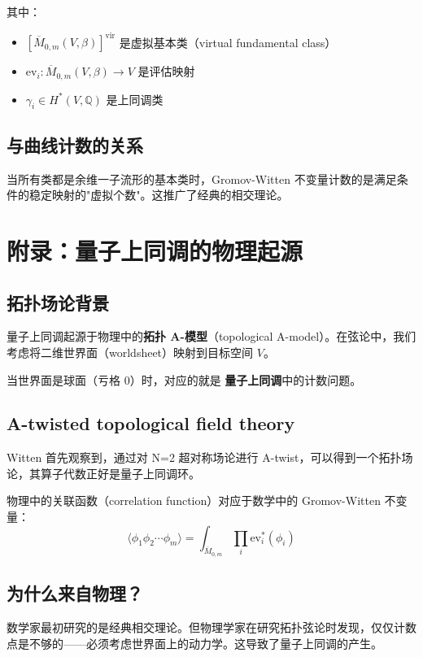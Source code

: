 其中：
\begin{itemize}
\item $[\overline{M}_{0,m}(V,\beta)]^{\text{vir}}$ 是虚拟基本类（virtual fundamental class）
\item $\text{ev}_i: \overline{M}_{0,m}(V,\beta) \to V$ 是评估映射
\item $\gamma_i \in H^*(V, \mathbb{Q})$ 是上同调类
\end{itemize}

\subsection*{与曲线计数的关系}

当所有类都是余维一子流形的基本类时，Gromov-Witten 不变量计数的是满足条件的稳定映射的"虚拟个数"。这推广了经典的相交理论。

\section{附录：量子上同调的物理起源}
\label{sec:quantum-cohomology-origin}

\subsection*{拓扑场论背景}

量子上同调起源于物理中的\textbf{拓扑 A-模型}（topological A-model）。在弦论中，我们考虑将二维世界面（worldsheet）映射到目标空间 $V$。

当世界面是球面（亏格 0）时，对应的就是 \textbf{量子上同调}中的计数问题。

\subsection*{A-twisted topological field theory}

Witten 首先观察到，通过对 N=2 超对称场论进行 A-twist，可以得到一个拓扑场论，其算子代数正好是量子上同调环。

物理中的关联函数（correlation function）对应于数学中的 Gromov-Witten 不变量：
$$\langle \phi_1 \phi_2 \cdots \phi_m \rangle = \int_{\overline{M}_{0,m}} \prod_i \text{ev}_i^*(\phi_i)$$

\subsection*{为什么来自物理？}

数学家最初研究的是经典相交理论。但物理学家在研究拓扑弦论时发现，仅仅计数点是不够的——必须考虑世界面上的动力学。这导致了量子上同调的产生。

